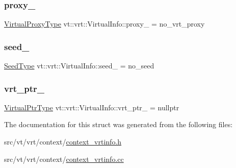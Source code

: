 \subsubsection{\texorpdfstring{proxy\+\_\+}{proxy\_}}
{\footnotesize\ttfamily \hyperlink{namespacevt_a1b417dd5d684f045bb58a0ede70045ac}{Virtual\+Proxy\+Type} vt\+::vrt\+::\+Virtual\+Info\+::proxy\+\_\+ = no\+\_\+vrt\+\_\+proxy\hspace{0.3cm}{\ttfamily [private]}}

\mbox{\label{structvt_1_1vrt_1_1_virtual_info_aaecc2238b249b5a4a91af1e467fc1d44}} 
\subsubsection{\texorpdfstring{seed\+\_\+}{seed\_}}
{\footnotesize\ttfamily \hyperlink{namespacevt_ae2e13198bdef4d5b8e603d6c1c7f0969}{Seed\+Type} vt\+::vrt\+::\+Virtual\+Info\+::seed\+\_\+ = no\+\_\+seed\hspace{0.3cm}{\ttfamily [private]}}

\mbox{\label{structvt_1_1vrt_1_1_virtual_info_ab8a5fcddd4869b90ec10c243efc8d1f4}} 
\subsubsection{\texorpdfstring{vrt\+\_\+ptr\+\_\+}{vrt\_ptr\_}}
{\footnotesize\ttfamily \hyperlink{structvt_1_1vrt_1_1_virtual_info_aede28e76785423dd2685fe4cf54afa21}{Virtual\+Ptr\+Type} vt\+::vrt\+::\+Virtual\+Info\+::vrt\+\_\+ptr\+\_\+ = nullptr\hspace{0.3cm}{\ttfamily [private]}}



The documentation for this struct was generated from the following files\+:\begin{DoxyCompactItemize}
\item 
src/vt/vrt/context/\hyperlink{context__vrtinfo_8h}{context\+\_\+vrtinfo.\+h}\item 
src/vt/vrt/context/\hyperlink{context__vrtinfo_8cc}{context\+\_\+vrtinfo.\+cc}\end{DoxyCompactItemize}
